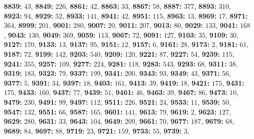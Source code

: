 \textsf{\bfseries 8839:} $43$, \textsf{\bfseries 8849:} $226$, \textsf{\bfseries 8861:} $42$, \textsf{\bfseries 8863:} $33$, \textsf{\bfseries 8867:} $58$, \textsf{\bfseries 8887:} $377$, \textsf{\bfseries 8893:} $310$, \textsf{\bfseries 8923:} $94$, \textsf{\bfseries 8929:} $52$, \textsf{\bfseries 8933:} $141$, \textsf{\bfseries 8941:} $42$, \textsf{\bfseries 8951:} $115$, \textsf{\bfseries 8963:} $13$, \textsf{\bfseries 8969:} $17$, \textsf{\bfseries 8971:} $364$, \textsf{\bfseries 8999:} $201$, \textsf{\bfseries 9001:} $280$, \textsf{\bfseries 9007:} $20$, \textsf{\bfseries 9011:} $207$, \textsf{\bfseries 9013:} $80$, \textsf{\bfseries 9029:} $133$, \textsf{\bfseries 9041:} $168$, \textsf{\bfseries 9043:} $130$, \textsf{\bfseries 9049:} $369$, \textsf{\bfseries 9059:} $113$, \textsf{\bfseries 9067:} $72$, \textsf{\bfseries 9091:} $127$, \textsf{\bfseries 9103:} $35$, \textsf{\bfseries 9109:} $30$, \textsf{\bfseries 9127:} $170$, \textsf{\bfseries 9133:} $13$, \textsf{\bfseries 9137:} $95$, \textsf{\bfseries 9151:} $12$, \textsf{\bfseries 9157:} $6$, \textsf{\bfseries 9161:} $28$, \textsf{\bfseries 9173:} $2$, \textsf{\bfseries 9181:} $61$, \textsf{\bfseries 9187:} $72$, \textsf{\bfseries 9199:} $142$, \textsf{\bfseries 9203:} $540$, \textsf{\bfseries 9209:} $120$, \textsf{\bfseries 9221:} $87$, \textsf{\bfseries 9227:} $54$, \textsf{\bfseries 9239:} $115$, \textsf{\bfseries 9241:} $355$, \textsf{\bfseries 9257:} $109$, \textsf{\bfseries 9277:} $224$, \textsf{\bfseries 9281:} $118$, \textsf{\bfseries 9283:} $543$, \textsf{\bfseries 9293:} $68$, \textsf{\bfseries 9311:} $38$, \textsf{\bfseries 9319:} $183$, \textsf{\bfseries 9323:} $79$, \textsf{\bfseries 9337:} $199$, \textsf{\bfseries 9341:} $200$, \textsf{\bfseries 9343:} $93$, \textsf{\bfseries 9349:} $43$, \textsf{\bfseries 9371:} $56$, \textsf{\bfseries 9377:} $5$, \textsf{\bfseries 9391:} $34$, \textsf{\bfseries 9397:} $18$, \textsf{\bfseries 9403:} $161$, \textsf{\bfseries 9413:} $39$, \textsf{\bfseries 9419:} $18$, \textsf{\bfseries 9421:} $175$, \textsf{\bfseries 9431:} $175$, \textsf{\bfseries 9433:} $160$, \textsf{\bfseries 9437:} $77$, \textsf{\bfseries 9439:} $51$, \textsf{\bfseries 9461:} $46$, \textsf{\bfseries 9463:} $39$, \textsf{\bfseries 9467:} $86$, \textsf{\bfseries 9473:} $10$, \textsf{\bfseries 9479:} $230$, \textsf{\bfseries 9491:} $99$, \textsf{\bfseries 9497:} $112$, \textsf{\bfseries 9511:} $226$, \textsf{\bfseries 9521:} $24$, \textsf{\bfseries 9533:} $11$, \textsf{\bfseries 9539:} $50$, \textsf{\bfseries 9547:} $132$, \textsf{\bfseries 9551:} $66$, \textsf{\bfseries 9587:} $165$, \textsf{\bfseries 9601:} $141$, \textsf{\bfseries 9613:} $79$, \textsf{\bfseries 9619:} $2$, \textsf{\bfseries 9623:} $127$, \textsf{\bfseries 9629:} $280$, \textsf{\bfseries 9631:} $33$, \textsf{\bfseries 9643:} $104$, \textsf{\bfseries 9649:} $209$, \textsf{\bfseries 9661:} $70$, \textsf{\bfseries 9677:} $187$, \textsf{\bfseries 9679:} $68$, \textsf{\bfseries 9689:} $84$, \textsf{\bfseries 9697:} $88$, \textsf{\bfseries 9719:} $23$, \textsf{\bfseries 9721:} $159$, \textsf{\bfseries 9733:} $55$, \textsf{\bfseries 9739:} $3$, 
